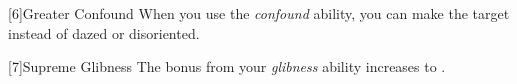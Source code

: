         [6]{Greater Confound} When you use the \textit{confound} ability, you can make the target  instead of dazed or disoriented.

        [7]{Supreme Glibness} The bonus from your \textit{glibness} ability increases to .







